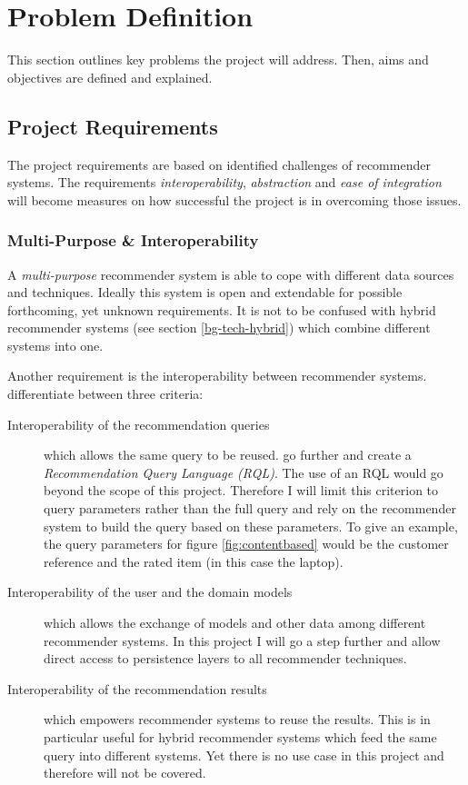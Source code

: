 \chapter{Problem Definition}
\label{problem}

This section outlines key problems the project will address. Then, aims and objectives are defined and explained.



\section{Project Requirements}

The project requirements are based on identified challenges of recommender systems. The requirements \emph{interoperability}, \emph{abstraction} and \emph{ease of integration} will become measures on how successful the project is in overcoming those issues.

\subsection{Multi-Purpose \& Interoperability}
\label{problem-multipurpose}

A \emph{multi-purpose} recommender system is able to cope with different data sources and techniques. Ideally this system is open and extendable for possible forthcoming, yet unknown requirements. It is not to be confused with hybrid recommender systems (see section \ref{bg-tech-hybrid}) which combine different systems into one.

Another requirement is the interoperability between recommender systems. \citet{manouselis07} differentiate between three criteria:

\begin{description}
    \item[Interoperability of the recommendation queries] which allows the same query to be reused. \citet{adomavicius05} go further and create a \emph{Recommendation Query Language (RQL)}. The use of an RQL would go beyond the scope of this project. Therefore I will limit this criterion to query parameters rather than the full query and rely on the recommender system to build the query based on these parameters. To give an example, the query parameters for figure \ref{fig:contentbased} would be the customer reference and the rated item (in this case the laptop).
    \item[Interoperability of the user and the domain models] which allows the exchange of models and other data among different recommender systems. In this project I will go a step further and allow direct access to persistence layers to all recommender techniques.
    \item[Interoperability of the recommendation results] which empowers recommender systems to reuse the results. This is in particular useful for hybrid recommender systems which feed the same query into different systems. Yet there is no use case in this project and therefore will not be covered.
\end{description}

